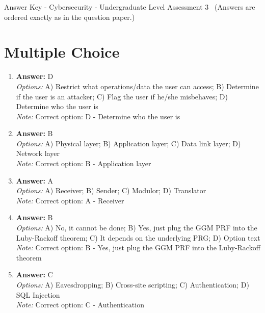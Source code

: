 \documentclass[12pt]{article}
\begin{document}
\begin{center}
Answer Key - Cybersecurity - Undergraduate Level Assessment 3 \
\small (Answers are ordered exactly as in the question paper.)
\end{center}

\section*{Multiple Choice}
\begin{enumerate}[label=\arabic*.]
\item \textbf{Answer:} D
\\ \textit{Options:} A) Restrict what operations/data the user can access; B) Determine if the user is an attacker; C) Flag the user if he/she misbehaves; D) Determine who the user is
\\ \textit{Note:} Correct option: D - Determine who the user is
\item \textbf{Answer:} B
\\ \textit{Options:} A) Physical layer; B) Application layer; C) Data link layer; D) Network layer
\\ \textit{Note:} Correct option: B - Application layer
\item \textbf{Answer:} A
\\ \textit{Options:} A) Receiver; B) Sender; C) Modulor; D) Translator
\\ \textit{Note:} Correct option: A - Receiver
\item \textbf{Answer:} B
\\ \textit{Options:} A) No, it cannot be done; B) Yes, just plug the GGM PRF into the Luby-Rackoff theorem; C) It depends on the underlying PRG; D) Option text
\\ \textit{Note:} Correct option: B - Yes, just plug the GGM PRF into the Luby-Rackoff theorem
\item \textbf{Answer:} C
\\ \textit{Options:} A) Eavesdropping; B) Cross-site scripting; C) Authentication; D) SQL Injection
\\ \textit{Note:} Correct option: C - Authentication
\end{enumerate}
\end{document}
